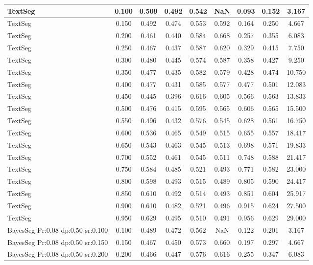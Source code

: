 \documentclass{article}
\begin{document}
\begin{longtable}[c]{|l|c|c|c|c|c|c|c|c|}
 TextSeg & 0.100 & 0.509 & 0.492 & 0.542 & NaN & 0.093 & 0.152 & 3.167  \\ \hline 
 TextSeg & 0.150 & 0.492 & 0.474 & 0.553 & 0.592 & 0.164 & 0.250 & 4.667  \\ \hline 
 TextSeg & 0.200 & 0.461 & 0.440 & 0.584 & 0.668 & 0.257 & 0.355 & 6.083  \\ \hline 
 TextSeg & 0.250 & 0.467 & 0.437 & 0.587 & 0.620 & 0.329 & 0.415 & 7.750  \\ \hline 
 TextSeg & 0.300 & 0.480 & 0.445 & 0.574 & 0.587 & 0.358 & 0.427 & 9.250  \\ \hline 
 TextSeg & 0.350 & 0.477 & 0.435 & 0.582 & 0.579 & 0.428 & 0.474 & 10.750  \\ \hline 
 TextSeg & 0.400 & 0.477 & 0.431 & 0.585 & 0.577 & 0.477 & 0.501 & 12.083  \\ \hline 
 TextSeg & 0.450 & 0.445 & 0.396 & 0.616 & 0.605 & 0.566 & 0.563 & 13.833  \\ \hline 
 TextSeg & 0.500 & 0.476 & 0.415 & 0.595 & 0.565 & 0.606 & 0.565 & 15.500  \\ \hline 
 TextSeg & 0.550 & 0.496 & 0.432 & 0.576 & 0.545 & 0.628 & 0.561 & 16.750  \\ \hline 
 TextSeg & 0.600 & 0.536 & 0.465 & 0.549 & 0.515 & 0.655 & 0.557 & 18.417  \\ \hline 
 TextSeg & 0.650 & 0.543 & 0.463 & 0.545 & 0.513 & 0.698 & 0.571 & 19.833  \\ \hline 
 TextSeg & 0.700 & 0.552 & 0.461 & 0.545 & 0.511 & 0.748 & 0.588 & 21.417  \\ \hline 
 TextSeg & 0.750 & 0.584 & 0.485 & 0.521 & 0.493 & 0.771 & 0.582 & 23.000  \\ \hline 
 TextSeg & 0.800 & 0.598 & 0.493 & 0.515 & 0.489 & 0.805 & 0.590 & 24.417  \\ \hline 
 TextSeg & 0.850 & 0.610 & 0.492 & 0.514 & 0.493 & 0.851 & 0.604 & 25.917  \\ \hline 
 TextSeg & 0.900 & 0.610 & 0.482 & 0.521 & 0.496 & 0.915 & 0.624 & 27.500  \\ \hline 
 TextSeg & 0.950 & 0.629 & 0.495 & 0.510 & 0.491 & 0.956 & 0.629 & 29.000  \\ \hline 
 BayesSeg Pr:0.08 dp:0.50 sr:0.100 & 0.100 & 0.489 & 0.472 & 0.562 & NaN & 0.122 & 0.201 & 3.167  \\ \hline 
 BayesSeg Pr:0.08 dp:0.50 sr:0.150 & 0.150 & 0.467 & 0.450 & 0.573 & 0.660 & 0.197 & 0.297 & 4.667  \\ \hline 
 BayesSeg Pr:0.08 dp:0.50 sr:0.200 & 0.200 & 0.466 & 0.447 & 0.576 & 0.616 & 0.255 & 0.347 & 6.083  \\ \hline 

\end{longtable}
\end{document}
